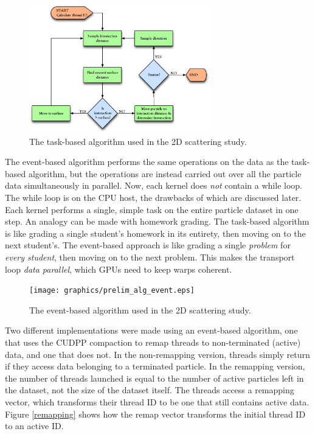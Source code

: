 \begin{figure}[h!] 
  \centering
    \includegraphics[width=0.7\textwidth]{graphics/prelim_alg_task.eps}
     \caption{The task-based algorithm used in the 2D scattering study. \label{prelim_alg_task} }
\end{figure}

The event-based algorithm performs the same operations on the data as the task-based algorithm, but the operations are instead carried out over all the particle data simultaneously in parallel.  Now, each kernel does \emph{not} contain a while loop.  The while loop is on the CPU host, the drawbacks of which are discussed later.  Each kernel performs a single, simple task on the entire particle dataset in one step.%
  An analogy can be made with homework grading.  The task-based algorithm is like grading a single student's homework in its entirety, then moving on to the next student's.  The event-based approach is like grading a single \emph{problem} for \emph{every student}, then moving on to the next problem.  This makes the transport loop \emph{data parallel}, which GPUs need to keep warps coherent. 

\begin{figure}[h!] 
  \centering
    \texttt{[image: graphics/prelim\_alg\_event.eps]}
     \caption{The event-based algorithm used in the 2D scattering study. \label{prelim_alg_event} }
\end{figure}%

Two different implementations were made using an event-based algorithm, one that uses the CUDPP compaction to remap threads to non-terminated (active) data, and one that does not.  In the non-remapping version, threads simply return if they access data belonging to a terminated particle.  In the remapping version, the number of threads launched is equal to the number of active particles left in the dataset, not the size of the dataset itself.  The threads access a remapping vector, which transforms their thread ID to be one that still contains active data.  Figure \ref{remapping} shows how the remap vector transforms the initial thread ID to an active ID.  

